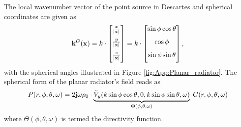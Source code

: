 The local wavenumber vector of the point source in Descartes and spherical coordinates are given as
\begin{equation}
\mathbf{k}^G(\mathbf{x}) = 
k \cdot \begin{bmatrix} \frac{x}{|\mathbf{x}|}  \\[.7em] \frac{y}{|\mathbf{x}|} \\[.7em] \frac{z}{|\mathbf{x}|}\\[0.5em]  \end{bmatrix}
=
k \cdot \begin{bmatrix} \sin \phi \cos \theta \\[.7em] \cos \phi  \\[.7em]  \sin \phi \sin \theta \\[0.5em]  \end{bmatrix},
\label{Eq:App:ps_k_vec}
\end{equation}
with the spherical angles illustrated in Figure \ref{fig:App:Planar_radiator}.
The spherical form of the planar radiator's field reads as
\begin{equation}
P(r,\phi,\theta,\omega) = 
2 \mathrm{j} \omega \rho_0 \cdot \underbrace{\tilde{V}_{y}(k \sin \phi \cos \theta ,0,k \sin \phi \sin \theta ,\omega) }_{\Theta(\phi,\theta,\omega)}
\cdot G(r,\phi,\theta,\omega) 
\label{Eq:App:directive_monopole}
\end{equation}
where $\Theta(\phi,\theta,\omega)$ is termed the directivity function.

